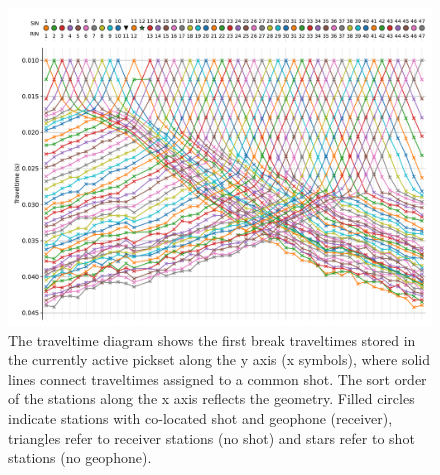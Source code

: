 \documentclass[a4paper,fleqn]{cas-sc}
\providecommand{\DIFdelbegin}{} %
\providecommand{\DIFdelend}{} %
\providecommand{\DIFaddbeginFL}{} %
\providecommand{\DIFaddendFL}{} %
\providecommand{\DIFdelbeginFL}{} %
\providecommand{\DIFdelendFL}{} %
\newcommand{\DIFscaledelfig}{0.5}
\newlength{\DIFdelgraphicswidth} %
\newlength{\DIFdelgraphicsheight} %
\newcommand{\DIFaddincludegraphics}[2][]{{\color{blue}\fbox{\DIFOincludegraphics[#1]{#2}}}} %
\newcommand{\DIFdelincludegraphics}[2][]{%
\sbox{\DIFdelgraphicsbox}{\DIFOincludegraphics[#1]{#2}}%
\settoboxwidth{\DIFdelgraphicswidth}{\DIFdelgraphicsbox} %
\settoboxtotalheight{\DIFdelgraphicsheight}{\DIFdelgraphicsbox} %
\scalebox{\DIFscaledelfig}{%
\parbox[b]{\DIFdelgraphicswidth}{\usebox{\DIFdelgraphicsbox}\\[-\baselineskip] \rule{\DIFdelgraphicswidth}{0em}}\llap{\resizebox{\DIFdelgraphicswidth}{\DIFdelgraphicsheight}{%
\setlength{\unitlength}{\DIFdelgraphicswidth}%
\begin{picture}(1,1)%
\thicklines\linethickness{2pt} %
{\color[rgb]{1,0,0}\put(0,0){\framebox(1,1){}}}%
{\color[rgb]{1,0,0}\put(0,0){\line( 1,1){1}}}%
{\color[rgb]{1,0,0}\put(0,1){\line(1,-1){1}}}%
\end{picture}%
}\hspace*{3pt}}} %
} %
\DeclareRobustCommand{\DIFdelbegin}{\DIFOdelbegin \let\includegraphics\DIFdelincludegraphics} %
\DeclareRobustCommand{\DIFdelend}{\DIFOaddend \let\includegraphics\DIFOincludegraphics} %
\DeclareRobustCommand{\DIFaddbeginFL}{\DIFOaddbeginFL \let\includegraphics\DIFaddincludegraphics} %
\DeclareRobustCommand{\DIFaddendFL}{\DIFOaddendFL \let\includegraphics\DIFOincludegraphics} %
\DeclareRobustCommand{\DIFdelbeginFL}{\DIFOdelbeginFL \let\includegraphics\DIFdelincludegraphics} %
\DeclareRobustCommand{\DIFdelendFL}{\DIFOaddendFL \let\includegraphics\DIFOincludegraphics} %
\begin{document}
\DIFdelend 
\begin{figure}
	\centering
	\DIFdelbeginFL %
\DIFdelendFL \DIFaddbeginFL \includegraphics[width=.75\textwidth]{figures/traveltimes_syn.pdf}
	\DIFaddendFL \caption{The traveltime diagram shows the first break traveltimes stored in the currently active pickset along the y axis (x symbols), where solid lines connect traveltimes assigned to a common shot. The sort order of the stations along the x axis reflects the geometry. Filled circles indicate stations with co-located shot and geophone (receiver), triangles refer to receiver stations (no shot) and stars refer to shot stations (no geophone).}
	\label{fig:traveltimes_intro}

\end{figure}
\DIFdelbegin %
\end{document}

